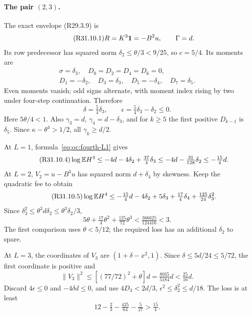 \paragraph{The pair \((2,3)\).}
The exact envelope (R29.3.9) is
\begin{equation}\tag{R31.10.1}\label{eq:oc:R31:10.1}
 R=K^3\mathbf1=-B^2u,\qquad\Gamma=d.
\end{equation}
Its row predecessor has squared norm
\(\delta_2\le\theta/3<9/25\), so \(c=5/4\). Its moments are
\begin{equation}\tag{R31.10.2}\label{eq:oc:R31:10.2}
 \begin{gathered}
 \sigma=\delta_3,\quad D_0=D_2=D_4=D_6=0,\\
 D_1=-\delta_2,\quad D_3=\delta_3,\quad
 D_5=-\delta_4,\quad D_7=\delta_5.
 \end{gathered}
\end{equation}
Even moments vanish; odd signs alternate, with moment index rising
by two under four-step continuation. Therefore
\begin{equation}\tag{R31.10.3}\label{eq:oc:R31:10.3}
 \delta=\tfrac54\delta_3,\qquad
 \epsilon=\tfrac54\delta_3-\delta_2\le0.
\end{equation}
Here \(5\theta/4<1\). Also
\(\gamma_3=d\), \(\gamma_4=d-\delta_3\), and for \(k\ge5\)
the first positive \(D_{k-1}\) is \(\delta_5\). Since
\(\kappa-\theta^4>1/2\), all \(\gamma_k\ge d/2\).

At \(L=1\), formula~\eqref{eq:oc:fourth-L1} gives
\begin{equation}\tag{R31.10.4}\label{eq:oc:R31:10.4}
 \log\mathbb E H^4\le-4d-4\delta_2+\tfrac{37}{4}\delta_3
 \le-4d-\tfrac{31}{128}\delta_2\le-\tfrac{15}{4}d.
\end{equation}
At \(L=2\), \(V_2=u-B^3u\) has squared norm \(d+\delta_4\)
by skewness. Keep the quadratic fee to obtain
\begin{equation}\tag{R31.10.5}\label{eq:oc:R31:10.5}
 \log\mathbb E H^4\le-\tfrac{15}{4}d-4\delta_2+5\delta_3
            +\tfrac{17}{4}\delta_4+\tfrac{125}{24}\delta_3^2.
\end{equation}
Since \(\delta_3^2\le\theta^3d\delta_2\le\theta^3\delta_2/3\),
\begin{equation}\tag{R31.10.6}\label{eq:oc:R31:10.6}
 5\theta+\tfrac{17}{4}\theta^2+\tfrac{125}{72}\theta^3
 <\tfrac{366625}{124416}<3.
\end{equation}
The first comparison uses \(\theta<5/12\); the required loss has
an additional \(\delta_2\) to spare.

At \(L=3\), the coordinates of \(V_3\) are
\((1+\delta-x^2,1)\). Since \(\delta\le5d/24\le5/72\),
the first coordinate is positive and
\begin{equation}\tag{R31.10.7}\label{eq:oc:R31:10.7}
 \|V_3\|^2\le[(77/72)^2+\theta]d
 =\tfrac{8035}{5184}d<\tfrac{25}{16}d.
\end{equation}
Discard \(4\epsilon\le0\) and \(-4\delta d\le0\), and use
\(4D_3<2d/3\), \(\epsilon^2\le\delta_2^2\le d/18\).
The loss is at least
\begin{equation}\tag{R31.10.8}\label{eq:oc:R31:10.8}
 12-\tfrac23-\tfrac{425}{64}-\tfrac5{27}>\tfrac{15}{4}.
\end{equation}

